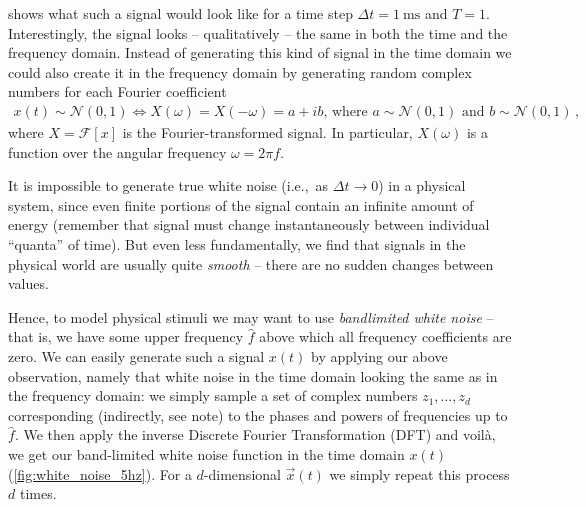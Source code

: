 \documentclass[10pt,letterpaper,oneside]{article}
\begin{document}
 shows what such a signal would look like for a time step $\Delta t = \SI{1}{\milli\second}$ and $T = 1$. Interestingly, the signal looks -- qualitatively -- the same in both the time and the frequency domain. Instead of generating this kind of signal in the time domain we could also create it in the frequency domain by generating random complex numbers for each Fourier coefficient
\begin{align*}
	x(t) \sim \mathcal{N}(0, 1) \Leftrightarrow X(\omega) = X(-\omega) = a + ib \text{, where } a \sim \mathcal{N}(0, 1) \text{ and } b \sim \mathcal{N}(0, 1) \,,
\end{align*}
where $X = \mathcal{F}[x]$ is the Fourier-transformed signal. In particular, $X(\omega)$ is a function over the angular frequency $\omega = 2\pi f$.

It is impossible to generate true white noise (i.e.,~as $\Delta t \to 0$) in a physical system, since even finite portions of the signal contain an infinite amount of energy (remember that signal must change instantaneously between individual \enquote{quanta} of time). But even less fundamentally, we find that signals in the physical world are usually quite \emph{smooth} -- there are no sudden changes between values.

Hence, to model physical stimuli we may want to use \emph{bandlimited white noise} -- that is, we have some upper frequency $\hat f$ above which all frequency coefficients are zero. We can easily generate such a signal $x(t)$ by applying our above observation, namely that white noise in the time domain looking the same as in the frequency domain: we simply sample a set of complex numbers $z_1, \ldots, z_d$ corresponding (indirectly, see note) to the phases and powers of frequencies up to $\hat f$. We then apply the inverse Discrete Fourier Transformation (DFT) and voilà, we get our band-limited white noise function in the time domain $x(t)$ (\cref{fig:white_noise_5hz}). For a $d$-dimensional $\vec x(t)$ we simply repeat this process $d$ times.
\end{document}
